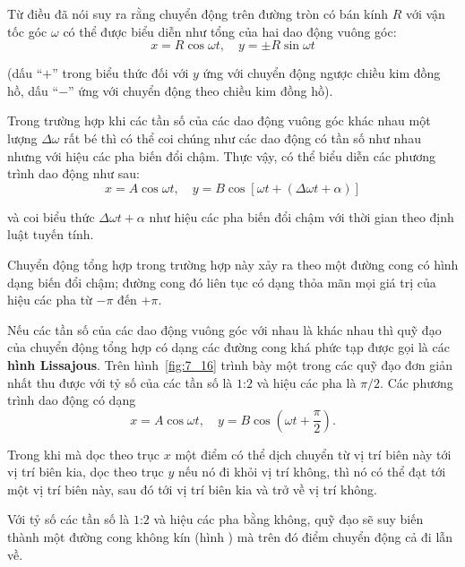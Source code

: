 Từ điều đã nói suy ra rằng chuyển động trên đường tròn có bán kính $R$ với vận tốc góc $\omega$ có thể được biểu diễn như tổng của hai dao động vuông góc:
\begin{equation}\label{eq:7_97}
	x = R\cos\omega t,\quad y = \pm R\sin\omega t
\end{equation}

\noindent
(dấu ``$+$'' trong biểu thức đối với $y$ ứng với chuyển động ngược chiều kim đồng hồ, dấu ``$-$'' ứng với chuyển động theo chiều kim đồng hồ).

Trong trường hợp khi các tần số của các dao động vuông góc khác nhau một lượng $\Delta\omega$ rất bé thì có thể coi chúng như các dao động có tần số như nhau nhưng với hiệu các pha biến đổi chậm. Thực vậy, có thể biểu diễn các phương trình dao động như sau:
\begin{equation*}
	x = A\cos\omega t,\quad y = B\cos[\omega t + (\Delta\omega t + \alpha)]
\end{equation*}

\noindent
và coi biểu thức $\Delta\omega t + \alpha$ như hiệu các pha biến đổi chậm với thời gian theo định luật tuyến tính.

Chuyển động tổng hợp trong trường hợp này xảy ra theo một đường cong có hình dạng biến đổi chậm; đường cong đó liên tục có dạng thỏa mãn mọi giá trị của hiệu các pha từ $-\pi$ đến $+\pi$.

Nếu các tần số của các dao động vuông góc với nhau là khác nhau thì quỹ đạo của chuyển động tổng hợp có dạng các đường cong khá phức tạp được gọi là các \textbf{hình Lissajous}. Trên hình~\ref{fig:7_16} trình bày một trong các quỹ đạo đơn giản nhất thu được với tỷ số của các tần số là $1$:$2$ và hiệu các pha là $\pi/2$. Các phương trình dao động có dạng
\begin{equation*}
	x = A\cos\omega t,\quad y = B\cos\left(\omega t + \frac{\pi}{2}\right).
\end{equation*}

\noindent
Trong khi mà dọc theo trục $x$ một điểm có thể dịch chuyển từ vị trí biên này tới vị trí biên kia, dọc theo trục $y$ nếu nó đi khỏi vị trí không, thì nó có thể đạt tới một vị trí biên này, sau đó tới vị trí biên kia và trở về vị trí không.

Với tỷ số các tần số là $1$:$2$ và hiệu các pha bằng không, quỹ đạo sẽ suy biến thành một đường cong không kín (hình ) mà trên đó điểm chuyển động cả đi lẫn về.

